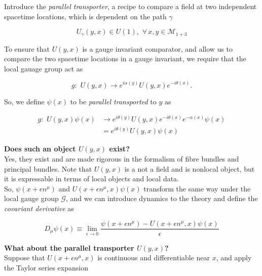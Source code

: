 \noindent Introduce the \textit{parallel transporter}, a recipe to compare a field at two independent spacetime locations, which is dependent on the path $\gamma$

\begin{equation}
U_\gamma (y,x) \in U(1), \,\, \forall \, x, y \in \mathcal{M}_{1+3}
\end{equation}

\noindent To ensure that $U(y,x)$ is a gauge invariant comparator, and allow us to compare the two spacetime locations in a gauge invariant, we require that the local gauage group act as

\begin{equation}
g: \,\, U(y,x) \rightarrow e^{i \alpha (y)} U(y,x) e^{-i \theta(x)}.
\end{equation}

\noindent So, we define $\psi(x)$ to be \textit{parallel transported} to $y$ as

\begin{align}
g: \,\, U(y,x) \psi(x) &\rightarrow e^{i \theta(y)} U(y,x) e^{-i \theta(x) }e^{- \alpha (x)} \psi(x) \\
&= e^{i \theta(y)} U(y,x)  \psi(x)
\end{align}

\noindent \textbf{Does such an object $U(y,x)$ exist?} \\

\noindent Yes, they exist and are made rigorous in the formalism of fibre bundles and principal bundles. Note that $U(y,x)$ is a not a field and is nonlocal object, but it is expressable in terms of local objects and local data. \\

\noindent So, $\psi(x + \epsilon n^\mu)$ and $U(x+\epsilon n^\mu, x)\psi(x)$ transform the same way under the local gauge group $\mathcal{G}$, and we can introduce dynamics to the theory and define the \textit{covariant derivative} as

\begin{equation}
D_\mu \psi (x) \equiv \lim_{\epsilon \rightarrow 0} \frac{\psi (x + \epsilon n^\mu) - U (x + \epsilon n^\mu, x) \psi (x)}{\epsilon}
\end{equation}

\noindent \textbf{What about the parallel transporter $U(y,x)$?} \\

\noindent Suppose that $U(x + \epsilon n^\mu , x)$ is continuous and differentiable near $x$, and apply the Taylor series expansion


